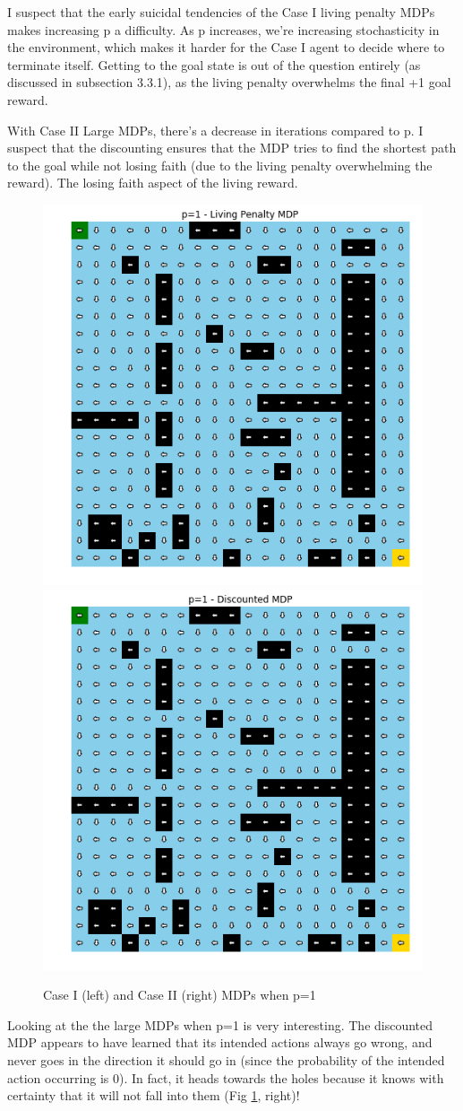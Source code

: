 \documentclass[letter]{article}
\begin{document}
I suspect that the early suicidal tendencies of the Case I living penalty MDPs makes increasing p a difficulty. As p increases, we're increasing stochasticity in the environment, which makes it harder for the Case I agent to decide where to terminate itself. Getting to the goal state is out of the question entirely (as discussed in subsection 3.3.1), as the living penalty overwhelms the final +1 goal reward.

With Case II Large MDPs, there's a decrease in iterations compared to p. I suspect that the discounting ensures that the MDP tries to find the shortest path to the goal while not losing faith (due to the living penalty overwhelming the reward). The losing faith aspect of the living reward.

\begin{figure}[]
    \centering
    \includegraphics[width=.4\linewidth]{p1penalty.png}
    \includegraphics[width=.4\linewidth]{p1discounted.png}
    \caption{Case I (left) and Case II (right) MDPs when p=1}
    \label{p1fig}
\end{figure}

Looking at the the large MDPs when p=1 is very interesting. The discounted MDP appears to have learned that its intended actions always go wrong, and never goes in the direction it should go in (since the probability of the intended action occurring is 0). In fact, it heads towards the holes because it knows with certainty that it will not fall into them (Fig \ref{p1fig}, right)!
\end{document}
